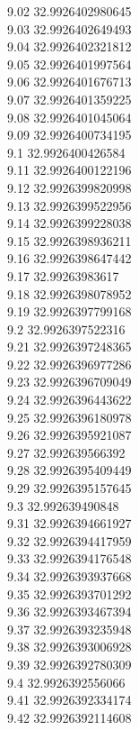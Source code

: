 {9.02	32.9926402980645\\
9.03	32.9926402649493\\
9.04	32.9926402321812\\
9.05	32.9926401997564\\
9.06	32.9926401676713\\
9.07	32.9926401359225\\
9.08	32.9926401045064\\
9.09	32.9926400734195\\
9.1	32.9926400426584\\
9.11	32.9926400122196\\
9.12	32.9926399820998\\
9.13	32.9926399522956\\
9.14	32.9926399228038\\
9.15	32.9926398936211\\
9.16	32.9926398647442\\
9.17	32.99263983617\\
9.18	32.9926398078952\\
9.19	32.9926397799168\\
9.2	32.9926397522316\\
9.21	32.9926397248365\\
9.22	32.9926396977286\\
9.23	32.9926396709049\\
9.24	32.9926396443622\\
9.25	32.9926396180978\\
9.26	32.9926395921087\\
9.27	32.992639566392\\
9.28	32.9926395409449\\
9.29	32.9926395157645\\
9.3	32.992639490848\\
9.31	32.9926394661927\\
9.32	32.9926394417959\\
9.33	32.9926394176548\\
9.34	32.9926393937668\\
9.35	32.9926393701292\\
9.36	32.9926393467394\\
9.37	32.9926393235948\\
9.38	32.9926393006928\\
9.39	32.9926392780309\\
9.4	32.9926392556066\\
9.41	32.9926392334174\\
9.42	32.9926392114608\\
}
